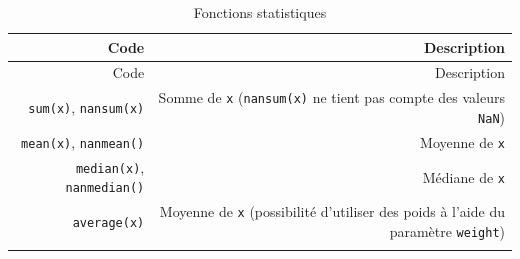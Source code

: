 \documentclass[12pt,]{book}
\numberwithin{equation}{section}
\numberwithin{countremarque}{section}
\begin{document}
\begin{longtable}[]{@{}rr@{}}
\caption{\label{tab:numpy-stats-fonctions} Fonctions
statistiques}\tabularnewline
\toprule
\begin{minipage}[b]{0.22\columnwidth}\raggedleft\strut
Code\strut
\end{minipage} & \begin{minipage}[b]{0.71\columnwidth}\raggedleft\strut
Description\strut
\end{minipage}\tabularnewline
\midrule
\endfirsthead
\toprule
\begin{minipage}[b]{0.22\columnwidth}\raggedleft\strut
Code\strut
\end{minipage} & \begin{minipage}[b]{0.71\columnwidth}\raggedleft\strut
Description\strut
\end{minipage}\tabularnewline
\midrule
\endhead
\begin{minipage}[t]{0.22\columnwidth}\raggedleft\strut
\texttt{sum(x)}, \texttt{nansum(x)}\strut
\end{minipage} & \begin{minipage}[t]{0.71\columnwidth}\raggedleft\strut
Somme de \texttt{x} (\texttt{nansum(x)} ne tient pas compte des valeurs
\texttt{NaN})\strut
\end{minipage}\tabularnewline
\begin{minipage}[t]{0.22\columnwidth}\raggedleft\strut
\texttt{mean(x)}, \texttt{nanmean()}\strut
\end{minipage} & \begin{minipage}[t]{0.71\columnwidth}\raggedleft\strut
Moyenne de \texttt{x}\strut
\end{minipage}\tabularnewline
\begin{minipage}[t]{0.22\columnwidth}\raggedleft\strut
\texttt{median(x)}, \texttt{nanmedian()}\strut
\end{minipage} & \begin{minipage}[t]{0.71\columnwidth}\raggedleft\strut
Médiane de \texttt{x}\strut
\end{minipage}\tabularnewline
\begin{minipage}[t]{0.22\columnwidth}\raggedleft\strut
\texttt{average(x)}\strut
\end{minipage} & \begin{minipage}[t]{0.71\columnwidth}\raggedleft\strut
Moyenne de \texttt{x} (possibilité d'utiliser des poids à l'aide du
paramètre \texttt{weight})\strut
\end{minipage}\tabularnewline
\begin{minipage}[t]{0.22\columnwidth}\raggedleft\strut

\end{minipage}
\end{longtable}
\end{document}
